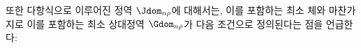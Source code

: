 
또한 다항식으로 이루어진 정역 $\Jdom_{n\rho}$에 대해서는, 이를 포함하는 최소 체와 마찬가지로 이를 포함하는 최소 상대정역 $\Gdom_{n\rho}$가 다음 조건으로 정의된다는 점을 언급한다:
